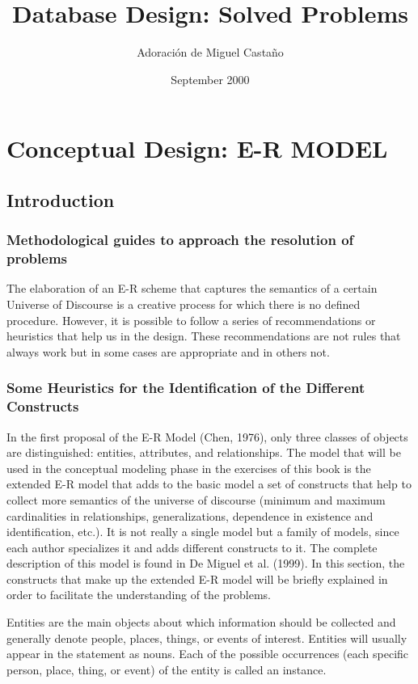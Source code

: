 \documentclass{article}
\title{Database Design: Solved Problems}
\author{Adoración de Miguel Castaño}
\date{September 2000}
\begin{document}
\maketitle

\section{Conceptual Design: E-R MODEL}

\subsection{Introduction}

\subsubsection{Methodological guides to approach the resolution of problems}

The elaboration of an E-R scheme that captures the semantics of a certain Universe of Discourse is a creative process for which there is no defined procedure.  However, it is possible to follow a series of recommendations or heuristics that help us in the design. These recommendations are not rules that always work but in some cases are appropriate and in others not.

\subsubsection{
Some Heuristics for the Identification of the Different Constructs}

In the first proposal of the E-R Model (Chen, 1976), only three classes of objects are distinguished: entities, attributes, and relationships. The model that will be used in the conceptual modeling phase in the exercises of this book is the extended E-R model that adds to the basic model a set of constructs that help to collect more semantics of the universe of discourse (minimum and maximum cardinalities in relationships, generalizations, dependence in existence and identification, etc.).  It is not really a single model but a family of models, since each author specializes it and adds different constructs to it.  The complete description of this model is found in De Miguel et al. (1999). In this section, the constructs that make up the extended E-R model will be briefly explained in order to facilitate the understanding of the problems.

Entities are the main objects about which information should be collected and generally denote people, places, things, or events of interest.  Entities will usually appear in the statement as nouns.  Each of the possible occurrences (each specific person, place, thing, or event) of the entity is called an instance.
\end{document}
